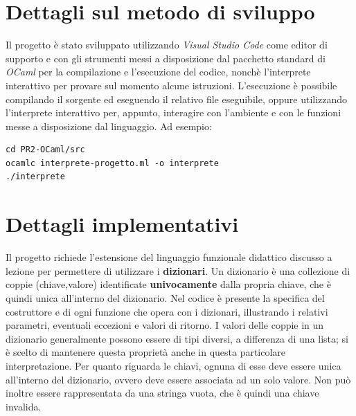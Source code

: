 \documentclass[10pt, italian, openany]{book}
\begin{document}
\section{Dettagli sul metodo di sviluppo}
Il progetto è stato sviluppato utilizzando \textit{Visual Studio Code} come editor di supporto e con gli strumenti messi a disposizione dal pacchetto standard di \textit{OCaml} per la compilazione e l'esecuzione del codice, nonchè l'interprete interattivo per provare sul momento alcune istruzioni. L'esecuzione è possibile compilando il sorgente ed eseguendo il relativo file eseguibile, oppure utilizzando l'interprete interattivo per, appunto, interagire con l'ambiente e con le funzioni messe a disposizione dal linguaggio. Ad esempio:

\begin{lstlisting}[style=bash]
cd PR2-OCaml/src
ocamlc interprete-progetto.ml -o interprete
./interprete
\end{lstlisting}

\section{Dettagli implementativi}
Il progetto richiede l'estensione del linguaggio funzionale didattico discusso a lezione per permettere di utilizzare i \textbf{dizionari}. Un dizionario è una collezione di coppie (chiave,valore) identificate \textbf{univocamente} dalla propria chiave, che è quindi unica all'interno del dizionario. Nel codice è presente la specifica del costruttore e di ogni funzione che opera con i dizionari, illustrando i relativi parametri, eventuali eccezioni e valori di ritorno. I valori delle coppie in un dizionario generalmente possono essere di tipi diversi, a differenza di una lista; si è scelto di mantenere questa proprietà anche in questa particolare interpretazione.
Per quanto riguarda le chiavi, ognuna di esse deve essere unica all'interno del dizionario, ovvero deve essere associata ad un solo valore. Non può inoltre essere rappresentata da una stringa vuota, che è quindi una chiave invalida.
\end{document}
